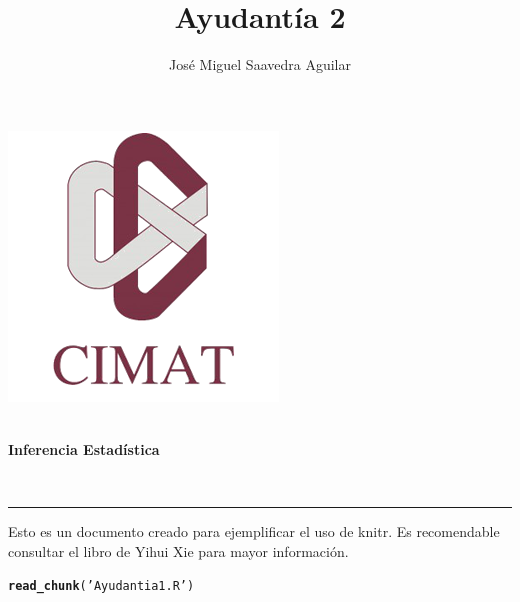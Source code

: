 \documentclass[10pt]{article}\usepackage[]{graphicx}\usepackage[]{xcolor}
\author{José Miguel Saavedra Aguilar}
\title{Ayudantía 2}
\makeatletter
\newcommand{\hlstr}[1]{\textcolor[rgb]{0.192,0.494,0.8}{#1}}%
\newcommand{\hlstd}[1]{\textcolor[rgb]{0.345,0.345,0.345}{#1}}%
\newcommand{\hlkwd}[1]{\textcolor[rgb]{0.737,0.353,0.396}{\textbf{#1}}}%
\newenvironment{kframe}{%
 \def\at@end@of@kframe{}%
 \ifinner\ifhmode%
  \def\at@end@of@kframe{\end{minipage}}%
  \begin{minipage}{\columnwidth}%
 \fi\fi%
 \def\FrameCommand##1{\hskip\@totalleftmargin \hskip-\fboxsep
 \colorbox{shadecolor}{##1}\hskip-\fboxsep
     \hskip-\linewidth \hskip-\@totalleftmargin \hskip\columnwidth}%
 \MakeFramed {\advance\hsize-\width
   \@totalleftmargin\z@ \linewidth\hsize
   \@setminipage}}%
 {\par\unskip\endMakeFramed%
 \at@end@of@kframe}
\newenvironment{knitrout}{}{} %
\makeatother
\begin{document}
\pagestyle{plain}

\setlength{\parskip}{10pt}
\setlength{\parindent}{5pt}
\begin{minipage}{0.2\linewidth}
\vspace{-1cm}
\includegraphics[width=0.9\linewidth]{logoCIMAT11.png}
\end{minipage}
\begin{minipage}{0.7\linewidth}
\vspace{-1cm}
\\
\textbf{Inferencia Estadística}
\end{minipage}
\vspace{-5mm}
\begin{center}
\textbf{\large \thetitle}\\   %
\vspace{3mm}
\theauthor
\end{center}
\vspace{-5mm}
\rule{\linewidth}{0.1mm}

Esto es un documento creado para ejemplificar el uso de knitr. Es recomendable consultar el libro de Yihui Xie \cite{Xie2015} para mayor información.
\begin{knitrout}
\color{fgcolor}\begin{kframe}
\begin{alltt}
\hlkwd{read_chunk}\hlstd{(}\hlstr{'Ayudantia 1.R'}\hlstd{)}
\end{alltt}
\end{kframe}
\end{knitrout}
\end{document}
